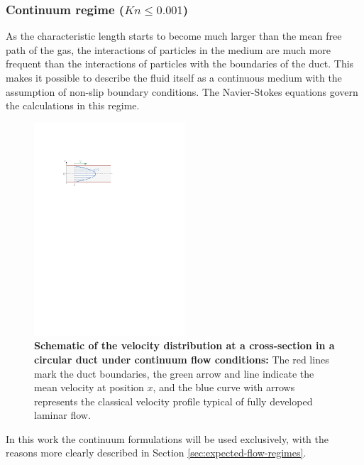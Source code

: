 \subsubsection*{Continuum regime ($Kn \leq 0.001$)}
	As the characteristic length starts to become much larger than the mean free path of the gas, the interactions of particles in the medium are much more frequent than the interactions of particles with the boundaries of the duct.
	This makes it possible to describe the fluid itself as a continuous medium with the assumption of non-slip boundary conditions.
	The Navier-Stokes equations govern the calculations in this regime.
	\begin{figure}[H]
	    \centering
	    \includegraphics[width=0.5\textwidth]{src/02_foundations/fig_continuum-regime.pdf}
		\caption[Schematic of the velocity distribution at a cross-section in a circular duct under continuum flow conditions.]{
			\textbf{Schematic of the velocity distribution at a cross-section in a circular duct under continuum flow conditions:}
			The red lines mark the duct boundaries, the green arrow and line indicate the mean velocity at position $x$, and the blue curve with arrows represents the classical velocity profile typical of fully developed laminar flow. \cite{Cengel2017}
		}
		\label{fig:non-slip-flow}
	\end{figure}

	In this work the continuum formulations will be used exclusively, with the reasons more clearly described in Section \ref{sec:expected-flow-regimes}.
	\cite{rapp2017microfluidics, putignano2012supersonic, halwidl_development_2016, leishman_internal_2023}
